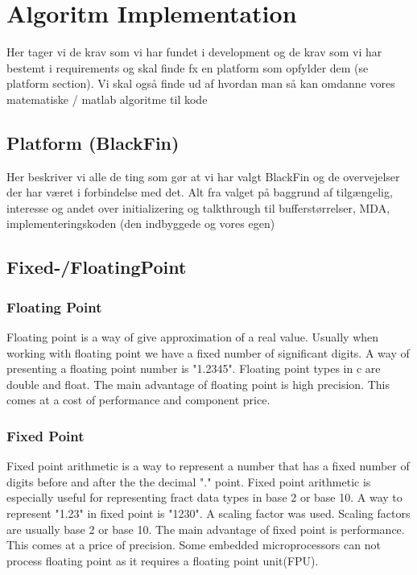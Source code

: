 \chapter{Algoritm Implementation}
Her tager vi de krav som vi har fundet i development og de krav som vi har bestemt i requirements og skal finde fx en platform som opfylder dem (se platform section). Vi skal også finde ud af hvordan man så kan omdanne vores matematiske / matlab algoritme til kode
\section{Platform (BlackFin)}
Her beskriver vi alle de ting som gør at vi har valgt BlackFin og de overvejelser der har været i forbindelse med det. Alt fra valget på baggrund af tilgængelig, interesse og andet over initializering og talkthrough til bufferstørrelser, MDA, implementeringskoden (den indbyggede og vores egen)

\section{Fixed-/FloatingPoint}
\subsection{Floating Point}
Floating point is a way of give approximation of a real value. Usually when working with floating point we have a fixed number of significant digits. A way of presenting a floating point number is "1.2345". Floating point types in c are double and float. The main advantage of floating point is high precision. This comes at a cost of performance and component price.\\
\subsection{Fixed Point}
Fixed point arithmetic is a way to represent a number that has a fixed number of digits before and after the the decimal "." point. Fixed point arithmetic is especially useful for representing fract data types in base 2 or base 10. A way to represent "1.23" in fixed point is "1230". A scaling factor was used. Scaling factors are usually base 2 or base 10. The main advantage of fixed point is performance. This comes at a price of precision. Some embedded microprocessors can not process floating point as it requires a floating point unit(FPU).\\
